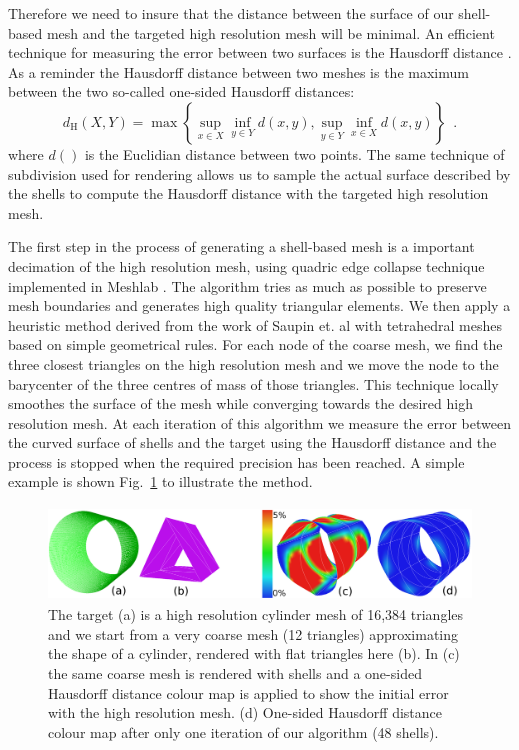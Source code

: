 \documentclass{llncs}
\begin{document}
Therefore we need to insure that the distance between the surface of our shell-based mesh and the targeted high resolution mesh will be minimal. An efficient technique for measuring the error between two surfaces is the Hausdorff distance \cite{Klein96,Cignoni98}. As a reminder the Hausdorff distance between two meshes is the maximum between the two so-called one-sided Hausdorff distances:
\begin{equation}
d_{\mathrm{H}}(X,Y) = \max \left\{ \sup_{x \in X} \inf_{y \in Y} d(x,y), \sup_{y \in Y} \inf_{x \in X} d(x,y) \right\} \enspace .
\end{equation}
where $d()$ is the Euclidian distance between two points. The same technique of subdivision used for rendering allows us to sample the actual surface described by the shells to compute the Hausdorff distance with the targeted high resolution mesh. 

The first step in the process of generating a shell-based mesh is a important decimation of the high resolution mesh, using quadric edge collapse technique implemented in Meshlab \cite{Meshlab}. The algorithm tries as much as possible to preserve mesh boundaries and generates high quality triangular elements. We then apply a heuristic method derived from the work of Saupin et. al \cite{Saupin07} with tetrahedral meshes based on simple geometrical rules. For each node of the coarse mesh, we find the three closest triangles on the high resolution mesh and we move the node to the barycenter of the three centres of mass of those triangles. This technique locally smoothes the surface of the mesh while converging towards the desired high resolution mesh. At each iteration of this algorithm we measure the error between the curved surface of shells and the target using the Hausdorff distance and the process is stopped when the required precision has been reached. A simple example is shown Fig.~\ref{fig-cylinder} to illustrate the method. 
%
\begin{figure}[htb]
\centering
\includegraphics[height=2.5cm]{images/exampleCylinder}
\caption {The target (a) is a high resolution cylinder mesh of 16,384 triangles and we start from a very coarse mesh (12 triangles) approximating the shape of a cylinder, rendered with flat triangles here (b). In (c) the same coarse mesh is rendered with shells and a one-sided Hausdorff distance colour map is applied to show the initial error with the high resolution mesh. (d) One-sided Hausdorff distance colour map after only one iteration of our algorithm (48 shells).}
\label{fig-cylinder}
\end{figure}
%
\end{document}
